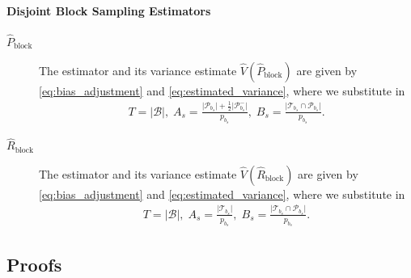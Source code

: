 \documentclass[fontsize=11pt]{article}
\theoremstyle{definition}
\begin{document}
\paragraph{Disjoint Block Sampling Estimators}

\begin{description}
    \item[$\widehat{P}_{\text{block}}$]{The estimator and its variance estimate $\widehat{V}(\widehat{P}_{\text{block}})$ are given by \eqref{eq:bias_adjustment} and \eqref{eq:estimated_variance}, where we substitute in}
    \begin{align}\label{eq:P_block}
        T = |\mathcal{B}|,\; A_s = \frac{\lvert \mathcal{P}_{b_s} \rvert + \frac{1}{2} \lvert \mathcal{P}_{b_s}^{-} \rvert}{p_{b_s}},\;
        B_s = \frac{\lvert \mathcal{T}_{b_s} \cap \mathcal{P}_{b_s} \rvert}{p_{b_s}}.
    \end{align}
    \item[$\widehat{R}_{\text{block}}$]{The estimator and its variance estimate $\widehat{V}(\widehat{R}_{\text{block}})$ are given by \eqref{eq:bias_adjustment} and \eqref{eq:estimated_variance}, where we substitute in}
    \begin{align}
        T = |\mathcal{B}|,\; A_s = \frac{\lvert \mathcal{T}_{b_s} \rvert}{p_{b_s}},\; B_s = 
        \frac{\lvert \mathcal{T}_{b_s} \cap \mathcal{P}_{b_s} \rvert}{p_{b_s}}.
    \end{align}
\end{description}


\subsection{Proofs}\label{appendix:proofs}
\end{document}
